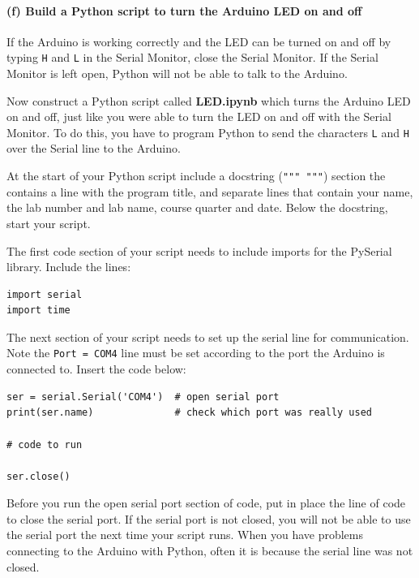 \documentclass[11pt]{article}
\begin{document}
    \hypertarget{f-build-a-python-script-to-turn-the-arduino-led-on-and-off}{%
\paragraph{(f) Build a Python script to turn the Arduino LED on and
off}\label{f-build-a-python-script-to-turn-the-arduino-led-on-and-off}}

If the Arduino is working correctly and the LED can be turned on and off
by typing \texttt{H} and \texttt{L} in the Serial Monitor, close the
Serial Monitor. If the Serial Monitor is left open, Python will not be
able to talk to the Arduino.

Now construct a Python script called \textbf{LED.ipynb} which turns the
Arduino LED on and off, just like you were able to turn the LED on and
off with the Serial Monitor. To do this, you have to program Python to
send the characters \texttt{L} and \texttt{H} over the Serial line to
the Arduino.

    At the start of your Python script include a docstring
(\texttt{"""\ """}) section the contains a line with the program title,
and separate lines that contain your name, the lab number and lab name,
course quarter and date. Below the docstring, start your script.

The first code section of your script needs to include imports for the
PySerial library. Include the lines:

\begin{verbatim}
import serial
import time
\end{verbatim}

The next section of your script needs to set up the serial line for
communication. Note the
\texttt{Port\ =\ \textquotesingle{}COM4\textquotesingle{}} line must be
set according to the port the Arduino is connected to. Insert the code
below:

\begin{verbatim}
ser = serial.Serial('COM4')  # open serial port
print(ser.name)              # check which port was really used

# code to run          

ser.close() 
\end{verbatim}

Before you run the open serial port section of code, put in place the
line of code to close the serial port. If the serial port is not closed,
you will not be able to use the serial port the next time your script
runs. When you have problems connecting to the Arduino with Python,
often it is because the serial line was not closed.
\end{document}
